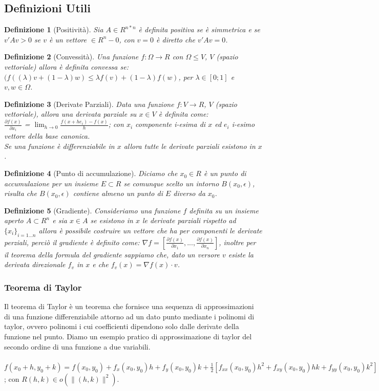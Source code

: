 \documentclass[a4paper, 12pt]{article}
\newtheorem{definition}{Definizione}
\begin{document}
\subsection{Definizioni Utili}
\begin{definition}[Positività]
Sia $A \in R^{n*n}$ è definita positiva se è simmetrica e se $v'Av > 0$ se $v$ è un vettore $\in R^n - {0}$, con $v = 0$ è diretto che $v'Av = 0$.
\end{definition}
\begin{definition}[Convessità]
Una funzione $f:\Omega \to R$ con $\Omega \leq V$, $V$ (spazio vettoriale) allora è definita convessa se: $(f((\lambda)v + (1 - \lambda)w) \leq \lambda f(v) + (1 - \lambda)f(w)$, per $\lambda \in [0;1]$ e $v, w \in \Omega$.
\end{definition}
\begin{definition}[Derivate Parziali]
Data una funzione $f:V \to R$, $V$ (spazio vettoriale), allora una derivata parziale su $x \in V$ è definita come:\\
$\frac{\partial f(x)}{\partial x_i}$ = $\lim_{h \to 0} \frac{f(x + h e_i) - f(x)}{h}$; con $x_i$ componente i-esima di $x$ ed $e_i$ i-esimo vettore della base canonica.\\
Se una funzione è differenziabile in $x$ allora tutte le derivate parziali esistono in $x$.
\end{definition}
\begin{definition}[Punto di accumulazione]
Diciamo che $x_0 \in R$ è un punto di accumulazione per un insieme $E \subset R$ se comunque scelto un intorno $B(x_0, \epsilon)$, risulta che $B(x_0, \epsilon)$ contiene almeno un punto di $E$ diverso da $x_0$.
\end{definition}
\begin{definition}[Gradiente]
Consideriamo una funzione $f$ definita su un insieme aperto $A \subset R^n$ e sia $x \in A$ se esistono in $x$ le derivate parziali rispetto ad $\{x_i\}_{i=1...n}$ allora è possibile costruire un vettore che ha per componenti le derivate perziali, perciò il gradiente è definito come: $\nabla f = [\frac{\partial f(x)}{\partial x_1}, ..., \frac{\partial f(x)}{\partial x_n}]$, inoltre per il teorema della formula del gradiente sappiamo che, dato un versore $v$ esiste la derivata direzionale $f_v$ in $x$ e che $f_v(x) = \nabla f(x) \cdot v$.
\end{definition}
\subsubsection{Teorema di Taylor}
Il teorema di Taylor è un teorema che fornisce una sequenza di approssimazioni di una funzione differenziabile attorno ad un dato punto mediante i polinomi di taylor, ovvero polinomi i cui coefficienti dipendono solo dalle derivate della funzione nel punto.
Diamo un esempio pratico di approssimazione di taylor del secondo ordine di una funzione a due variabili.\\\\
$f(x_0+h, y_0+k) = f(x_0, y_0) + f_x(x_0, y_0)h + f_y(x_0, y_0)k + \frac{1}{2}[f_{xx}(x_0, y_0)h^2 + f_{xy}(x_0, y_0)hk + f_{yy}(x_0, y_0)k^2] + R(h, k)$; con $R(h, k) \in o(\parallel (h, k) \parallel^2)$.
\end{document}
